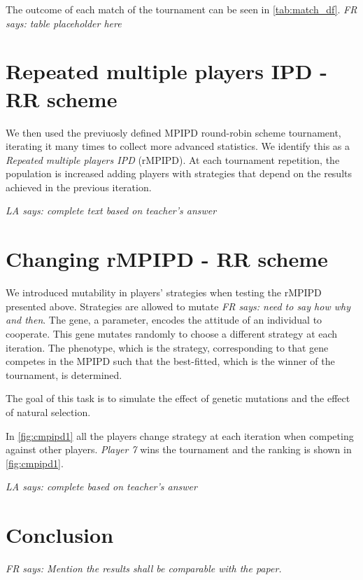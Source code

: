 \documentclass[journal,a4paper,10pt,twoside,draft=false]{IEEEtran}
\newcommand{\FR}[1]{\textit{\color{ForestGreen}FR says: #1}}
\newcommand{\LA}[1]{\textit{\color{orange}LA says: #1}}
\begin{document}
The outcome of each match of the tournament can be seen in \autoref{tab:match_df}. \FR{table placeholder here}

\newpage %
\section{Repeated multiple players IPD - RR scheme} \label{s:rIPDMP}
We then used the previuosly defined MPIPD round-robin scheme tournament, iterating it many times to collect more advanced statistics.
We identify this as a \textit{Repeated multiple players IPD} (rMPIPD).
At each tournament repetition, the population is increased adding players with strategies that depend on the results achieved in the previous iteration.

\LA{complete text based on teacher's answer}



\newpage
\section{Changing rMPIPD - RR scheme} \label{s:crIPDMP}
We introduced mutability in players' strategies when testing the rMPIPD presented above.
Strategies are allowed to mutate \FR{need to say how why and then}.
The gene, a parameter, encodes the attitude of an individual to cooperate. This gene mutates randomly to choose a different strategy at each iteration. The phenotype, which is the strategy, corresponding to that gene competes in the MPIPD such that the best-fitted, which is the winner of the tournament, is determined.

The goal of this task is to simulate the effect of genetic mutations and the effect of natural selection.

In \autoref{fig:cmpipd1} all the players change strategy at each iteration when competing against other players. \textit{Player 7} wins the tournament and the ranking is shown in \autoref{fig:cmpipd1}.

\LA{complete based on teacher's answer}


\section{Conclusion} \label{s:conc}

\FR{Mention the results shall be comparable with the paper.}

%
%
\end{document}
